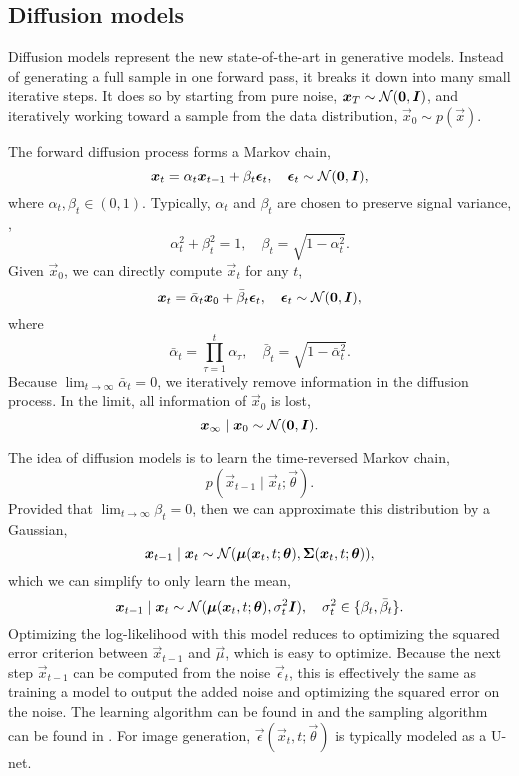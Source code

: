 \subsection{Diffusion models}

Diffusion models represent the new state-of-the-art in generative models. Instead of generating a
full sample in one forward pass, it breaks it down into many small iterative steps. It does so by
starting from pure noise, $\bm{x}_T \sim \mathcal{N}(\bm{0}, \bm{I})$, and iteratively working
toward a sample from the data distribution, $\vec{x}_0 \sim p(\vec{x})$.

The forward diffusion process forms a Markov chain, \[
    \bm{x}_t = \alpha_t \bm{x}_{t-1} + \beta_t \bm{\epsilon}_t, \quad \bm{\epsilon}_t \sim \mathcal{N}(\bm{0}, \bm{I}),
\]
where $\alpha_t, \beta_t \in (0,1)$. Typically, $\alpha_t$ and $\beta_t$ are chosen to preserve
signal variance, \ie, \[
    \alpha_t^2 + \beta_t^2 = 1, \quad \beta_t = \sqrt{1 - \alpha_t^2}.
\]
Given $\vec{x}_0$, we can directly compute $\vec{x}_t$ for any $t$, \[
    \bm{x}_t = \bar{\alpha}_t \bm{x}_0 + \bar{\beta}_t \bm{\epsilon}_t, \quad \bm{\epsilon}_t \sim \mathcal{N}(\bm{0}, \bm{I}),
\]
where \[
    \bar{\alpha}_t = \prod_{\tau=1}^{t} \alpha_\tau, \quad \bar{\beta}_t = \sqrt{1 - \bar{\alpha}_t^2}.
\]
Because $\lim_{t \to \infty} \bar{\alpha}_t = 0$, we iteratively remove information in the
diffusion process. In the limit, all information of $\vec{x}_0$ is lost, \[
    \bm{x}_{\infty} \mid \bm{x}_0 \sim \mathcal{N}(\bm{0}, \bm{I}).
\]

The idea of diffusion models is to learn the time-reversed Markov chain, \[
    p(\vec{x}_{t-1} \mid \vec{x}_t; \vec{\theta}).
\]
Provided that $\lim_{t\to \infty} \beta_t = 0$, then we can approximate this distribution by a
Gaussian, \[
    \bm{x}_{t-1} \mid \bm{x}_t \sim \mathcal{N}(\bm{\mu}(\bm{x}_t, t; \bm{\theta}), \bm{\Sigma}(\bm{x}_t, t; \bm{\theta})),
\]
which we can simplify to only learn the mean, \[
    \bm{x}_{t-1} \mid \bm{x}_t \sim \mathcal{N}(\bm{\mu}(\bm{x}_t, t; \bm{\theta}), \sigma_t^2 \bm{I}), \quad \sigma_t^2 \in \{ \beta_t, \bar{\beta}_t \}.
\]
Optimizing the log-likelihood with this model reduces to optimizing the squared error criterion
between $\vec{x}_{t-1}$ and $\vec{\mu}$, which is easy to optimize. Because the next step
$\vec{x}_{t-1}$ can be computed from the noise $\vec{\epsilon}_t$, this is effectively the same as
training a model to output the added noise and optimizing \wrt the squared error on the noise. The
learning algorithm can be found in  and the sampling algorithm can be found
in . For image generation, $\vec{\epsilon}(\vec{x}_t, t; \vec{\theta})$ is
typically modeled as a U-net.


